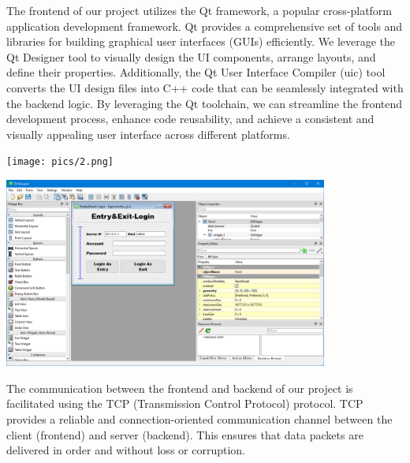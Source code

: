 {{		The frontend of our project utilizes the Qt framework, a popular
		cross-platform application development framework. Qt provides a
		comprehensive set of tools and libraries for building graphical user
		interfaces (GUIs) efficiently. We leverage the Qt Designer tool to
		visually design the UI components, arrange layouts, and define their
		properties. Additionally, the Qt User Interface Compiler (uic) tool
		converts the UI design files into C++ code that can be seamlessly
		integrated with the backend logic. By leveraging the Qt toolchain, we
		can streamline the frontend development process, enhance code
		reusability, and achieve a consistent and visually appealing user
		interface across different platforms.
		\begin{center}
			\centering
			\texttt{[image: pics/2.png]}
		\end{center}
		
		\begin{center}
			\centering
			\includegraphics[width=0.8\textwidth]{pics/3.png}
		\end{center}

		The communication between the frontend and backend of our project is
		facilitated using the TCP (Transmission Control Protocol) protocol. TCP
		provides a reliable and connection-oriented communication channel
		between the client (frontend) and server (backend). This ensures that
		data packets are delivered in order and without loss or corruption.
		
}}
